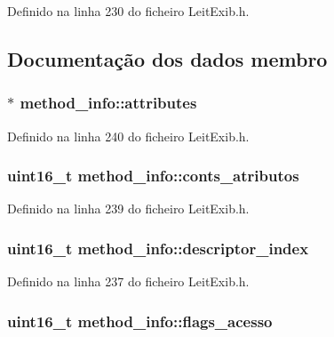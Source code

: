 Definido na linha 230 do ficheiro Leit\-Exib.\-h.



\subsection{Documentação dos dados membro}
\hypertarget{structmethod__info_a8ce4caaa03680c91f548558a38647ad8}{
\subsubsection[{attributes}]{$\ast$ method\-\_\-info\-::attributes}}\label{structmethod__info_a8ce4caaa03680c91f548558a38647ad8}


Definido na linha 240 do ficheiro Leit\-Exib.\-h.

\hypertarget{structmethod__info_a23e8e7b47fe7f4e69e00b96313ec76ad}{
\subsubsection[{conts\-\_\-atributos}]{\setlength{\rightskip}{0pt plus 5cm}uint16\-\_\-t method\-\_\-info\-::conts\-\_\-atributos}}\label{structmethod__info_a23e8e7b47fe7f4e69e00b96313ec76ad}


Definido na linha 239 do ficheiro Leit\-Exib.\-h.

\hypertarget{structmethod__info_abccd6a5202d4c0ee1be6b89692d0352a}{
\subsubsection[{descriptor\-\_\-index}]{\setlength{\rightskip}{0pt plus 5cm}uint16\-\_\-t method\-\_\-info\-::descriptor\-\_\-index}}\label{structmethod__info_abccd6a5202d4c0ee1be6b89692d0352a}


Definido na linha 237 do ficheiro Leit\-Exib.\-h.

\hypertarget{structmethod__info_a200169cf04858f0fe263f2b905ccb0bf}{
\subsubsection[{flags\-\_\-acesso}]{\setlength{\rightskip}{0pt plus 5cm}uint16\-\_\-t method\-\_\-info\-::flags\-\_\-acesso}}\label{structmethod__info_a200169cf04858f0fe263f2b905ccb0bf}


